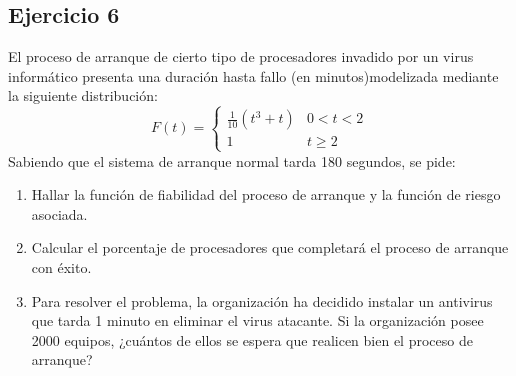 \subsection{Ejercicio 6}
El  proceso  de  arranque  de  cierto  tipo  de  procesadores  invadido  por un  virus  informático  presenta  una duración hasta fallo (en minutos)modelizada mediante la siguiente distribución:
\[ F(t)=\begin{cases} 
      \frac{1}{10}(t^3+t) & 0<t<2 \\
      1 & t\geq 2 
   \end{cases}
\]
Sabiendo que el sistema de arranque normal tarda 180 segundos, se pide:
\begin{enumerate}
    \item Hallar la función de fiabilidad del proceso de arranque y la función de riesgo asociada.
    \begin{tcolorbox}[colback=white,colframe=cyan!50!black,fonttitle=\bfseries]

    \end{tcolorbox}\textbf{}
    \item Calcular el porcentaje de procesadores que completará el proceso de arranque con éxito.
    \begin{tcolorbox}[colback=white,colframe=cyan!50!black,fonttitle=\bfseries]

    \end{tcolorbox}
    \item Para  resolver  el  problema,  la  organización  ha  decidido instalar  un  antivirus  que  tarda  1  minuto  en eliminar  el  virus atacante.  Si  la  organización  posee  2000  equipos,  ¿cuántos  de  ellos se  espera  que realicen bien el proceso de arranque?
    \begin{tcolorbox}[colback=white,colframe=cyan!50!black,fonttitle=\bfseries]

    \end{tcolorbox}
\end{enumerate}